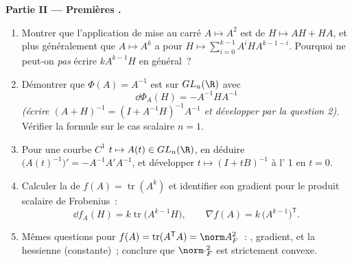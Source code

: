 \begin{problem}
\medskip
\noindent\textbf{Partie II --- Premières .}
\begin{enumerate}[resume]
  \item Montrer que l'application de mise au carré $A \mapsto A^2$ est
         de  $H \mapsto AH + HA$,
        et plus généralement que $A \mapsto A^k$ a pour
         $H \mapsto \sum_{i=0}^{k-1}
        A^iHA^{k-1-i}$. Pourquoi ne peut-on \emph{pas} écrire
        $kA^{k-1}H$ en général~?
  \item Démontrer que $\Phi(A) = A^{-1}$ est  sur
        $GL_n(\R)$ avec
        \[
        \dd\Phi_A(H) = -A^{-1}HA^{-1}
        \]
        \emph{(écrire $(A + H)^{-1} = (I + A^{-1}H)^{-1}A^{-1}$
        et développer par la question 2)}. Vérifier la formule sur
        le cas scalaire $n = 1$.
  \item Pour une courbe $C^1$ $t \mapsto A(t) \in GL_n(\R)$, en
        déduire $\bigl(A(t)^{-1}\bigr)' = -A^{-1}A'A^{-1}$, et
        développer $t \mapsto (I + tB)^{-1}$ à l' 1 en $t = 0$.
  \item Calculer la  de $f(A) =
        \operatorname{tr}(A^k)$ et identifier son gradient pour
        le produit scalaire de Frobenius~:
        \[
        \dd f_A(H) = k\operatorname{tr}\bigl(A^{k-1}H\bigr),
        \qquad
        \nabla f(A) = k\,\bigl(A^{k-1}\bigr)^{\mathsf T} .
        \]
  \item Mêmes questions pour $f(A) = \operatorname{tr}
        (A^{\mathsf T}A) = \norm A_F^2$~: ,
        gradient, et la hessienne (constante)~; conclure que
        $\norm\cdot_F^2$ est strictement convexe.
\end{enumerate}


\end{problem}
